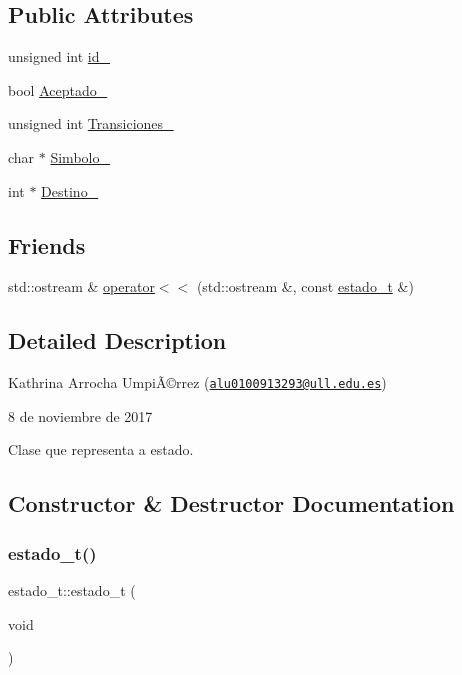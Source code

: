 \subsection*{Public Attributes}
\begin{DoxyCompactItemize}
\item 
unsigned int \hyperlink{classestado__t_aba266da7e77f2633dc7296babf9893c9}{id\+\_\+}
\item 
bool \hyperlink{classestado__t_ada7ab9464df89cd55932c81d54a0a246}{Aceptado\+\_\+}
\item 
unsigned int \hyperlink{classestado__t_af3db2b51130263e7a94d36018303bb48}{Transiciones\+\_\+}
\item 
char $\ast$ \hyperlink{classestado__t_af9afe7e6634f65b6e5e664810d5941d1}{Simbolo\+\_\+}
\item 
int $\ast$ \hyperlink{classestado__t_a2b1d0cb5028c3e687bc954c1dccb6fa5}{Destino\+\_\+}
\end{DoxyCompactItemize}
\subsection*{Friends}
\begin{DoxyCompactItemize}
\item 
std\+::ostream \& \hyperlink{classestado__t_abd9a0348d2219634dee1ab5c9d3a2083}{operator$<$$<$} (std\+::ostream \&, const \hyperlink{classestado__t}{estado\+\_\+t} \&)
\end{DoxyCompactItemize}


\subsection{Detailed Description}
Kathrina Arrocha UmpiÃ©rrez (\href{mailto:alu0100913293@ull.edu.es}{\tt alu0100913293@ull.\+edu.\+es})

8 de noviembre de 2017

Clase que representa a estado. 

\subsection{Constructor \& Destructor Documentation}
\mbox{\label{classestado__t_a8e45cb6ecaf97bb8e9a33f82151f9323}} 
\subsubsection{\texorpdfstring{estado\+\_\+t()}{estado\_t()}\hspace{0.1cm}{\footnotesize\ttfamily [1/4]}}
{\footnotesize\ttfamily estado\+\_\+t\+::estado\+\_\+t (\begin{DoxyParamCaption}\item[{void}]{ }\end{DoxyParamCaption})}

